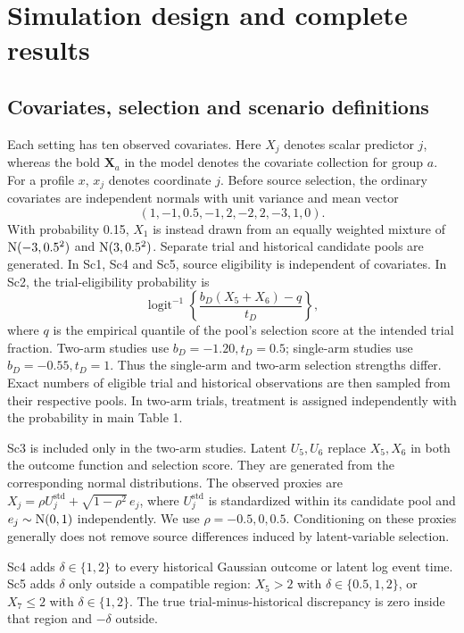 \section{Simulation design and complete results}\label{sec:E}
\subsection{Covariates, selection and scenario definitions}\label{sec:E.1}
Each setting has ten observed covariates. Here $X_j$ denotes scalar predictor $j$, whereas the bold $\mathbf{X}_a$ in the model denotes the covariate collection for group $a$. For a profile $x$, $x_j$ denotes coordinate $j$. Before source selection, the ordinary covariates are independent normals with unit variance and mean vector
\begin{equation}
(1,-1,0.5,-1,2,-2,2,-3,1,0).
\end{equation}
With probability 0.15, $X_1$ is instead drawn from an equally weighted mixture of $\mathrm{N}(-3,0.5^2)$ and $\mathrm{N}(3,0.5^2)$. Separate trial and historical candidate pools are generated. In Sc1, Sc4 and Sc5, source eligibility is independent of covariates. In Sc2, the trial-eligibility probability is
\begin{equation}\label{eq:select}
\operatorname{logit}^{-1}\left\{\frac{b_D(X_5+X_6)-q}{t_D}\right\},
\end{equation}
where $q$ is the empirical quantile of the pool's selection score at the intended trial fraction. Two-arm studies use $b_D=-1.20,t_D=0.5$; single-arm studies use $b_D=-0.55,t_D=1$. Thus the single-arm and two-arm selection strengths differ. Exact numbers of eligible trial and historical observations are then sampled from their respective pools. In two-arm trials, treatment is assigned independently with the probability in main Table 1.

Sc3 is included only in the two-arm studies. Latent $U_5,U_6$ replace $X_5,X_6$ in both the outcome function and selection score. They are generated from the corresponding normal distributions. The observed proxies are $X_j=\rho U_j^{\mathrm{std}}+\sqrt{1-\rho^2}\,e_j$, where $U_j^{\mathrm{std}}$ is standardized within its candidate pool and $e_j\sim\mathrm{N}(0,1)$ independently. We use $\rho=-0.5,0,0.5$. Conditioning on these proxies generally does not remove source differences induced by latent-variable selection.

Sc4 adds $\delta\in\{1,2\}$ to every historical Gaussian outcome or latent log event time. Sc5 adds $\delta$ only outside a compatible region: $X_5>2$ with $\delta\in\{0.5,1,2\}$, or $X_7\leq2$ with $\delta\in\{1,2\}$. The true trial-minus-historical discrepancy is zero inside that region and $-\delta$ outside. 

